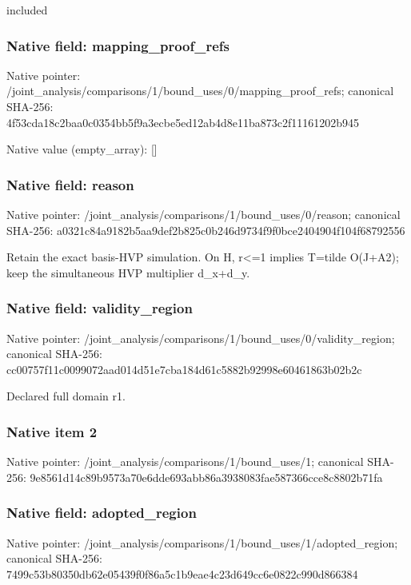 \documentclass[10pt,a4paper]{article}
\begin{document}
\begingroup\raggedright\sloppy included\par\endgroup

\subsubsection{Native field: mapping\_\allowbreak{}proof\_\allowbreak{}refs}
Native pointer: /joint\_\allowbreak{}analysis/comparisons/1/bound\_\allowbreak{}uses/0/mapping\_\allowbreak{}proof\_\allowbreak{}refs; canonical SHA-256: 4f53cda18c2baa0c0354bb5f9a3ecbe5ed12ab4d8e11ba873c2f11161202b945

Native value (empty\_\allowbreak{}array): []

\subsubsection{Native field: reason}
Native pointer: /joint\_\allowbreak{}analysis/comparisons/1/bound\_\allowbreak{}uses/0/reason; canonical SHA-256: a0321c84a9182b5aa9def2b825c0b246d9734f9f0bce2404904f104f68792556

\begingroup\raggedright\sloppy Retain the exact basis-HVP simulation. On H,\allowbreak{} r<=\allowbreak{}1 implies T=\allowbreak{}tilde O(J+A2);\allowbreak{} keep the simultaneous HVP multiplier d\_\allowbreak{}x+d\_\allowbreak{}y.\par\endgroup

\subsubsection{Native field: validity\_\allowbreak{}region}
Native pointer: /joint\_\allowbreak{}analysis/comparisons/1/bound\_\allowbreak{}uses/0/validity\_\allowbreak{}region; canonical SHA-256: cc00757f11c0099072aad014d51e7cba184d61c5882b92998e60461863b02b2c

\begingroup\raggedright\sloppy Declared full domain r1.\par\endgroup

\subsubsection{Native item 2}
Native pointer: /joint\_\allowbreak{}analysis/comparisons/1/bound\_\allowbreak{}uses/1; canonical SHA-256: 9e8561d14c89b9573a70e6dde693abb86a3938083fae587366cce8c8802b71fa

\subsubsection{Native field: adopted\_\allowbreak{}region}
Native pointer: /joint\_\allowbreak{}analysis/comparisons/1/bound\_\allowbreak{}uses/1/adopted\_\allowbreak{}region; canonical SHA-256: 7499c53b80350db62e05439f0f86a5c1b9eae4c23d649cc6e0822c990d866384
\end{document}
